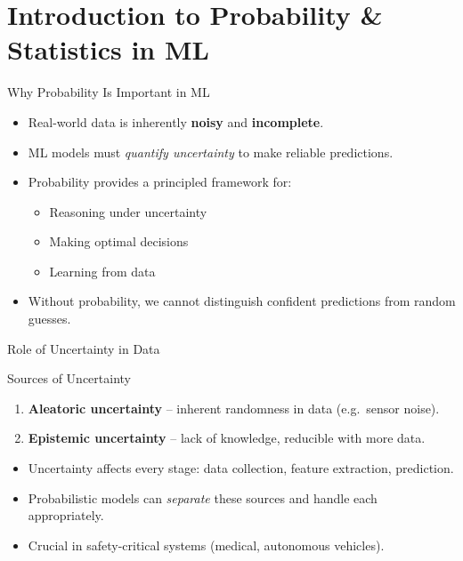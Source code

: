 \section{Introduction to Probability \& Statistics in ML}

\begin{frame}{Why Probability Is Important in ML}
\begin{itemize}
    \item Real-world data is inherently \textbf{noisy} and \textbf{incomplete}.
    \item ML models must \emph{quantify uncertainty} to make reliable predictions.
    \item Probability provides a principled framework for:
    \begin{itemize}
        \item Reasoning under uncertainty
        \item Making optimal decisions
        \item Learning from data
    \end{itemize}
    \item Without probability, we cannot distinguish confident predictions from random guesses.
\end{itemize}
\end{frame}

\begin{frame}{Role of Uncertainty in Data}
\begin{block}{Sources of Uncertainty}
\begin{enumerate}
    \item \textbf{Aleatoric uncertainty} -- inherent randomness in data (e.g.\ sensor noise).
    \item \textbf{Epistemic uncertainty} -- lack of knowledge, reducible with more data.
\end{enumerate}
\end{block}
\vspace{6pt}
\begin{itemize}
    \item Uncertainty affects every stage: data collection, feature extraction, prediction.
    \item Probabilistic models can \emph{separate} these sources and handle each appropriately.
    \item Crucial in safety-critical systems (medical, autonomous vehicles).
\end{itemize}
\end{frame}

